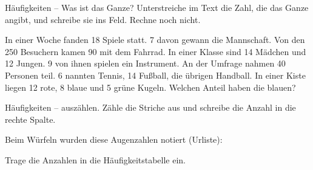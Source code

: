 \setcounter{aufgabe}{7}

\begin{aufgabe}{Häufigkeiten -- Was ist das Ganze? Unterstreiche im Text die Zahl, die das Ganze angibt, und schreibe sie ins Feld. Rechne noch nicht.}
\begin{teile}
\teil In einer Woche fanden 18 Spiele statt. 7 davon gewann die Mannschaft. \leerfeld
\teil Von den 250 Besuchern kamen 90 mit dem Fahrrad. \leerfeld
\teil In einer Klasse sind 14 Mädchen und 12 Jungen. 9 von ihnen spielen ein Instrument. \leerfeld
\teil An der Umfrage nahmen 40 Personen teil. 6 nannten Tennis, 14 Fußball, die übrigen Handball. \leerfeld
\teil In einer Kiste liegen 12 rote, 8 blaue und 5 grüne Kugeln. Welchen Anteil haben die blauen? \leerfeld
\end{teile}
\end{aufgabe}

\begin{aufgabe}{Häufigkeiten -- auszählen. Zähle die Striche aus und schreibe die Anzahl in die rechte Spalte.}


\begin{teile}
\setcounter{teil}{4}
\teil Beim Würfeln wurden diese Augenzahlen notiert (Urliste):
\par\smallskip
{}
\par\smallskip
Trage die Anzahlen in die Häufigkeitstabelle ein.
\end{teile}

\end{aufgabe}


